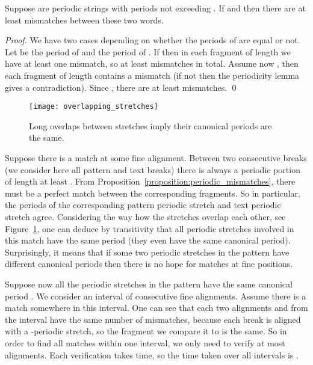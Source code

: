 \documentclass[runningheads]{llncs}
\begin{document}
\begin{proposition}\label{proposition:periodic_mismatches}
Suppose  are periodic strings with periods not exceeding . If  and  then there are at least  mismatches between these two words.
\end{proposition}

\begin{proof}
We have two cases depending on whether the periods of  are equal or not. Let  be the period of  and  the period of . If  then in each fragment of length  we have at least one mismatch, so at least  mismatches in total. Assume now , then each fragment of length  contains a mismatch (if not then the periodicity lemma gives a contradiction). Since , there are at least  mismatches.
\qed
\end{proof}

\begin{figure}[t]
\texttt{[image: overlapping\_stretches]}
\caption{Long overlaps between stretches imply their canonical periods are the same.}
\label{figure:overlapping stretches}
\end{figure}

Suppose there is a match at some fine alignment. Between two consecutive breaks (we consider here all pattern and text breaks) there is always a periodic portion of length at least . From Proposition~\ref{proposition:periodic_mismatches}, there must be a perfect match between the corresponding fragments. So in particular, the periods of the corresponding pattern periodic stretch and text periodic stretch agree. Considering the way how the stretches overlap each other, see Figure~\ref{figure:overlapping stretches}, one can deduce by transitivity that all periodic stretches involved in this match have the same period (they even have the same canonical period). Surprisingly, it means that if some two periodic stretches in the pattern have different canonical periods then there is no hope for matches at fine positions. 

Suppose now all the periodic stretches in the pattern have the same canonical period . We consider an interval of consecutive fine alignments. Assume there is a match somewhere in this interval. One can see that each two alignments  and  from the interval have the same number of mismatches, because each break is aligned with a -periodic stretch, so 
the fragment we compare it to is the same.
So in order to find all matches within one interval, we only need to verify at most  alignments. Each verification takes  time, so the time taken over all intervals is .
\end{document}
